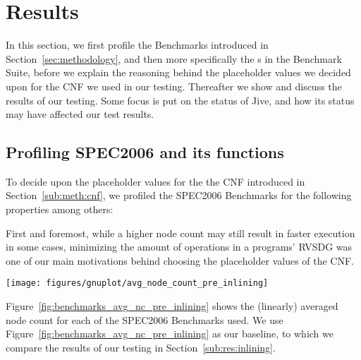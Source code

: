 
\clearpage
\section{Results}
\label{sec:res}

In this section, we first profile the Benchmarks introduced in
Section~\ref{sec:methodology}, and then more specifically the \applyNode s in
the Benchmark Suite, before we explain the reasoning behind the placeholder
values we decided upon for the CNF we used in our testing. Thereafter we show
and discuss the results of our testing. Some focus is put on the status of Jive,
and how its status may have affected our test results.

\subsection{Profiling SPEC2006 and its functions}
\label{sub:res:profiling}

To decide upon the placeholder values for the the CNF introduced in
Section~\ref{sub:meth:cnf}, we profiled the SPEC2006 Benchmarks for the
following properties among others:

First and foremost, while a higher node count may still result in faster
execution in some cases, minimizing the amount of operations in a programs'
RVSDG was one of our main motivations behind choosing the placeholder values of
the CNF.

\begin{centering}
	\noindent\begin{minipage}{\textwidth}
		\captionsetup{type=figure}
		\hspace{-1em}
		\texttt{[image: figures/gnuplot/avg\_node\_count\_pre\_inlining]}
	\end{minipage}
	\label{fig:benchmarks_avg_nc_pre_inlining}
\end{centering}

Figure~\ref{fig:benchmarks_avg_nc_pre_inlining} shows the (linearly) averaged
node count for each of the SPEC2006 Benchmarks used. We use
Figure~\ref{fig:benchmarks_avg_nc_pre_inlining} as our baseline, to which we
compare the results of our testing in Section~\ref{sub:res:inlining}.


